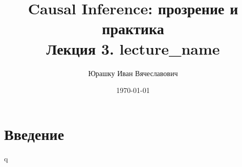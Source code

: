 

\newcommand{\coursename}{Causal Inference: прозрение и практика}
\title{
    \textbf{\coursename}\\
    Лекция 3. lecture_name
}
\author{Юрашку Иван Вячеславович}
\date{\today}



    \maketitle

    \section*{Введение}
        q


